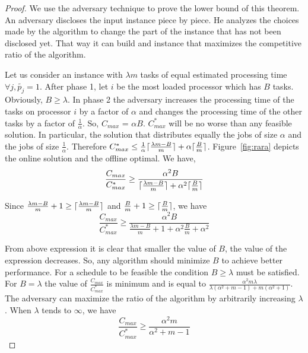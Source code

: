 \documentclass[10pt, conference, compsocconf]{IEEEtran}
\DeclarePairedDelimiter{\ceil}{\lceil}{\rceil}
\begin{document}
\begin{proof}
  We use the adversary technique to prove the lower bound of this
  theorem. An adversary discloses the input instance piece by
  piece. He analyzes the choices made by the algorithm to change the
  part of the instance that has not been disclosed yet. That way it
  can build and instance that maximizes the competitive ratio of the
  algorithm.
 
  Let us consider an instance with $\lambda m$ tasks of equal
  estimated processing time $\forall j, \tilde{p_j} = 1$. After phase
  1, let $i$ be the most loaded processor which has $B$
  tasks. Obviously, $B \geq \lambda$. In phase 2 the adversary
  increases the processing time of the tasks on processor $i$ by a
  factor of $\alpha$ and changes the processing time of the other
  tasks by a factor of $\frac{1}{\alpha}$. So, $ C_{max}$ = $\alpha
  B$. ${C^{*}_{max}}$ will be no worse than any feasible solution. In
  particular, the solution that distributes equally the jobs of size
  $\alpha$ and the jobs of size $\frac{1}{\alpha}$. Therefore
  ${C^{*}_{max}} \leq \frac{1}{\alpha }\ceil {\frac{\lambda m - B
    }{m}}+ \alpha\ceil{\frac{B}{m}} $.  Figure~\ref{fig:rara} depicts
  the online solution and the offline optimal. We have,
 \begin{equation}\nonumber
   \frac{C_{max}}{C^{*}_{max}}
   \geq \frac{\alpha^{2} B  }{\ceil{\frac{
        \lambda m - B }{m}}+\alpha^2\ceil{\frac{B}{m}}}
 \end{equation}
   
 Since $\frac{ \lambda m - B }{m} +1 \geq\ceil{\frac{ \lambda m - B
   }{m}}$ and $\frac{B}{m}+1\geq\ceil{\frac{B}{m}}$, we have
 \begin{equation}\nonumber
   \frac{C_{max}}{C^{*}_{max}}
   \geq \frac{\alpha^{2} B  }{\frac{
       \lambda m - B }{m}+1+\alpha^2\frac{B}{m}+\alpha^{2}}
 \end{equation}
 
 From above expression it is clear that smaller the value of $B$, the
 value of the expression decreases. So, any algorithm should minimize
 $B$ to achieve better performance.  For a schedule to be feasible the
 condition $B \geq \lambda$ must be satisfied. For $B = \lambda$ the
 value of $\frac{C_{max}}{C^{*}_{max}}$ is minimum and is equal to
 $\frac{\alpha^{2} m \lambda }{\lambda(\alpha^{2}+m-1)+
   m(\alpha^{2}+1)}$. The adversary can maximize the ratio of the
 algorithm by arbitrarily increasing $\lambda$. When $\lambda$ tends
 to $\infty$, we have
 \begin{equation}\nonumber
       \frac{C_{max}}{C^{*}_{max}}
       \geq \frac{\alpha^{2}m  }{\alpha^{2}+m-1}
     \end{equation}
 


\end{proof}
\end{document}
